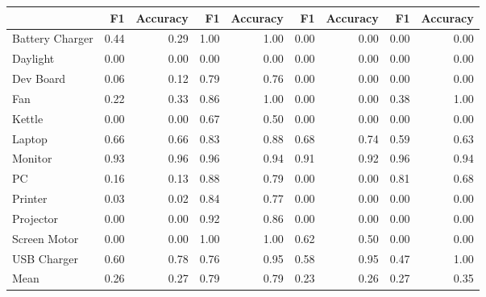 \begin{tabular}{lrrrrrrrr}
\toprule
{} &    F1 &  Accuracy &    F1 &  Accuracy &    F1 &  Accuracy &    F1 &  Accuracy \\
\midrule
Battery Charger &  0.44 &      0.29 &  1.00 &      1.00 &  0.00 &      0.00 &  0.00 &      0.00 \\
Daylight        &  0.00 &      0.00 &  0.00 &      0.00 &  0.00 &      0.00 &  0.00 &      0.00 \\
Dev Board       &  0.06 &      0.12 &  0.79 &      0.76 &  0.00 &      0.00 &  0.00 &      0.00 \\
Fan             &  0.22 &      0.33 &  0.86 &      1.00 &  0.00 &      0.00 &  0.38 &      1.00 \\
Kettle          &  0.00 &      0.00 &  0.67 &      0.50 &  0.00 &      0.00 &  0.00 &      0.00 \\
Laptop          &  0.66 &      0.66 &  0.83 &      0.88 &  0.68 &      0.74 &  0.59 &      0.63 \\
Monitor         &  0.93 &      0.96 &  0.96 &      0.94 &  0.91 &      0.92 &  0.96 &      0.94 \\
PC              &  0.16 &      0.13 &  0.88 &      0.79 &  0.00 &      0.00 &  0.81 &      0.68 \\
Printer         &  0.03 &      0.02 &  0.84 &      0.77 &  0.00 &      0.00 &  0.00 &      0.00 \\
Projector       &  0.00 &      0.00 &  0.92 &      0.86 &  0.00 &      0.00 &  0.00 &      0.00 \\
Screen Motor    &  0.00 &      0.00 &  1.00 &      1.00 &  0.62 &      0.50 &  0.00 &      0.00 \\
USB Charger     &  0.60 &      0.78 &  0.76 &      0.95 &  0.58 &      0.95 &  0.47 &      1.00 \\
Mean            &  0.26 &      0.27 &  0.79 &      0.79 &  0.23 &      0.26 &  0.27 &      0.35 \\
\bottomrule
\end{tabular}
